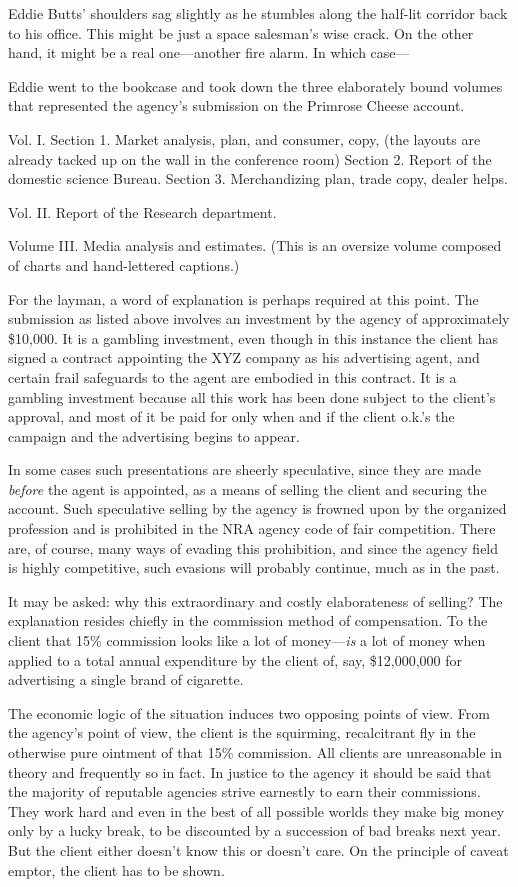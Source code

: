 \documentclass[twoside,nohyper,openany,nobib]{tufte-book}
\begin{document}
Eddie Butts' shoulders sag slightly as he stumbles along the half-lit
corridor back to his office. This might be just a space salesman's wise
crack. On the other hand, it might be a real one---another fire alarm.
In which case---

Eddie went to the bookcase and took down the three elaborately bound
volumes that represented the agency's submission on the Primrose Cheese
account.

Vol. I. Section 1. Market analysis, plan, and consumer, copy, (the
layouts are already tacked up on the wall in the conference room)
Section 2. Report of the domestic science Bureau. Section 3.
Merchandizing plan, trade copy, dealer helps.

Vol. II. Report of the Research department.

Volume III. Media analysis and estimates. (This is an oversize volume
composed of charts and hand-lettered captions.)

For the layman, a word of explanation is perhaps required at this point.
The submission as listed above involves an investment by the agency of
approximately \$10,000. It is a gambling investment, even though in this
instance the client has signed a contract appointing the XYZ company as
his advertising agent, and certain frail safeguards to the agent are
embodied in this contract. It is a gambling investment because all this
work has been done subject to the client's approval, and most of it be
paid for only when and if the client o.k.'s the campaign and the
advertising begins to appear.

In some cases such presentations are sheerly speculative, since they are
made \emph{before} the agent is appointed, as a means of selling the
client and securing the account. Such speculative selling by the agency
is frowned upon by the organized profession and is prohibited in the NRA
agency code of fair competition. There are, of course, many ways of
evading this prohibition, and since the agency field is highly
competitive, such evasions will probably continue, much as in the past.

It may be asked: why this extraordinary and costly elaborateness of
selling? The explanation resides chiefly in the commission method of
compensation. To the client that 15\% commission looks like a lot of
money---\emph{is} a lot of money when applied to a total annual
expenditure by the client of, say, \$12,000,000 for advertising a single
brand of cigarette.

The economic logic of the situation induces two opposing points of view.
From the agency's point of view, the client is the squirming,
recalcitrant fly in the otherwise pure ointment of that 15\% commission.
All clients are unreasonable in theory and frequently so in fact. In
justice to the agency it should be said that the majority of reputable
agencies strive earnestly to earn their commissions. They work hard and
even in the best of all possible worlds they make big money only by a
lucky break, to be discounted by a succession of bad breaks next year.
But the client either doesn't know this or doesn't care. On the
principle of caveat emptor, the client has to be shown.
\end{document}

